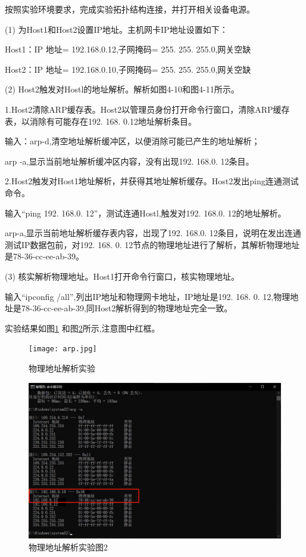 \documentclass[lang=cn,11pt,a4paper,cite=authoryear]{elegantpaper}
\begin{document}
按照实验环境要求，完成实验拓扑结构连接，并打开相关设备电源。

(1)	为Host1和Host2设置IP地址。主机网卡IP地址设置如下：

Host1：IP 地址= 192.168.0.12,子网掩码= 255. 255. 255.0,网关空缺

Host2：IP 地址= 192.168.0.10,子网掩码= 255. 255. 255.0,网关空缺

(2)	Host2触发对Hostl的地址解析。解析如图4-10和图4-11所示。

1.Host2清除ARP缓存表。Host2以管理员身份打开命令行窗口，清除ARP缓存表，以消除有可能存在192. 168. 0.12地址解析条目。

输入：arp-d,清空地址解析缓冲区，以便消除可能已产生的地址解析；

arp -a,显示当前地址解析缓冲区内容，没有出现192. 168.0. 12条目。

2.Host2触发对Host1地址解析，并获得其地址解析缓存。Host2发出ping连通测试命令。

输入“ping 192. 168.0. 12”，测试连通Hostl,触发对192. 168.0. 12的地址解析。

arp-a,显示当前地址解析缓存表内容，岀现了192. 168.0. 12条目，说明在发出连通测试IP数据包前，对192. 168. 0. 12节点的物理地址进行了解析，其解析物理地址是78-36-cc-ee-ab-39。

(3)	核实解析物理地址。Host1打开命令行窗口，核实物理地址。

输入“ipconfig /all”,列出IP地址和物理网卡地址，IP地址是192. 168. 0. 12,物理地址是78-36-cc-ee-ab-39,同Host2解析得到的物理地址完全一致。

实验结果如图\ref{fig:arp} 和图\ref{fig:screenshot012}所示,注意图中红框。

\begin{figure}[htbp]
	\centering
	\texttt{[image: arp.jpg]}
	\caption{物理地址解析实验}
	\label{fig:arp}
\end{figure}


\begin{figure}[htbp]
	\centering
	\includegraphics[width=0.7\linewidth]{image/screenshot012}
	\caption{物理地址解析实验图2}
	\label{fig:screenshot012}
\end{figure}
\end{document}
